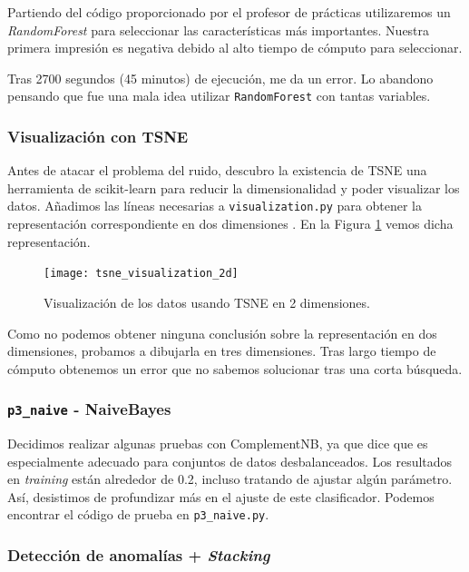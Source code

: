 \documentclass[a4paper, 20pt]{article}
\begin{document}
Partiendo del código proporcionado por el profesor de prácticas utilizaremos un \textit{RandomForest} para seleccionar las características más importantes. Nuestra primera impresión es negativa debido al alto tiempo de cómputo para seleccionar.

Tras 2700 segundos (45 minutos) de ejecución, me da un error. Lo abandono pensando que fue una mala idea utilizar \texttt{RandomForest} con tantas variables.

\subsubsection{Visualización con TSNE}

Antes de atacar el problema del ruido, descubro la existencia de TSNE \cite{noauthor_sklearn.manifold.tsne_nodate} una herramienta de scikit-learn para reducir la dimensionalidad y poder visualizar los datos. Añadimos las líneas necesarias a \texttt{visualization.py} para obtener la representación correspondiente en dos dimensiones \cite{noauthor_3.6.10.5._nodate}. En la Figura \ref{fig:tsne2d} vemos dicha representación.

\begin{figure}[H]
    \centering
    \texttt{[image: tsne\_visualization\_2d]}
    \caption{Visualización de los datos usando TSNE en 2 dimensiones.}
    \label{fig:tsne2d}
\end{figure}

Como no podemos obtener ninguna conclusión sobre la representación en dos dimensiones, probamos a dibujarla en tres dimensiones. Tras largo tiempo de cómputo obtenemos un error que no sabemos solucionar tras una corta búsqueda.

\subsubsection{\texttt{p3\_naive} - NaiveBayes}

Decidimos realizar algunas pruebas con ComplementNB, ya que \cite{noauthor_sklearn.naive_bayes.complementnb_nodate} dice que es especialmente adecuado para conjuntos de datos desbalanceados. Los resultados en \textit{training} están alrededor de 0.2, incluso tratando de ajustar algún parámetro. Así, desistimos de profundizar más en el ajuste de este clasificador. Podemos encontrar el código de prueba en \texttt{p3\_naive.py}.

\subsubsection{Detección de anomalías + \textit{Stacking}}
\end{document}
